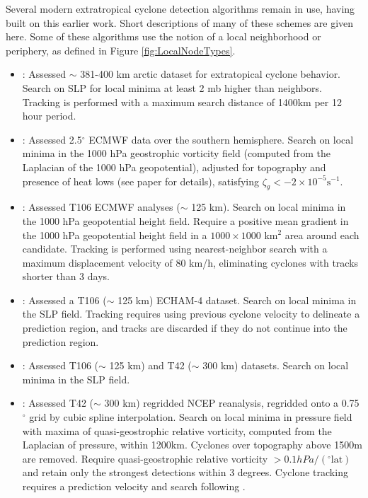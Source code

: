 \documentclass[gmdd, hvmath, online]{copernicus_discussions}
\begin{document}
Several modern extratropical cyclone detection algorithms remain in use, having built on this earlier work.  Short descriptions of many of these schemes are given here.  Some of these algorithms use the notion of a local neighborhood or periphery, as defined in Figure \ref{fig:LocalNodeTypes}.

\begin{itemize}
\item \cite{serreze1993characteristics, serreze1995climatological}:  Assessed $\sim$ 381-400 km arctic dataset for extratopical cyclone behavior.  Search on SLP for local minima at least 2 mb higher than neighbors.  Tracking is performed with a maximum search distance of 1400km per 12 hour period.

\item \cite{sinclair1994objective, sinclair1997objective}:  Assessed 2.5$^\circ$ ECMWF data over the southern hemisphere.  Search on local minima in the 1000 hPa geostrophic vorticity field (computed from the Laplacian of the 1000 hPa geopotential), adjusted for topography and presence of heat lows (see paper for details), satisfying $\zeta_g < -2 \times 10^{-5} \mbox{s}^{-1}$.

\item \cite{blender1997identification}:  Assessed T106 ECMWF analyses ($\sim$ 125 km).  Search on local minima in the 1000 hPa geopotential height field.  Require a positive mean gradient in the 1000 hPa geopotential height field in a $1000 \times 1000$ km$^2$ area around each candidate.  Tracking is performed using nearest-neighbor search with a maximum displacement velocity of 80 km/h, eliminating cyclones with tracks shorter than 3 days.

\item \cite{lionello2002cyclones}:  Assessed a T106 ($\sim$ 125 km) ECHAM-4 dataset.  Search on local minima in the SLP field.  Tracking requires using previous cyclone velocity to delineate a prediction region, and tracks are discarded if they do not continue into the prediction region.

\item \cite{zolina2002improving}:  Assessed T106 ($\sim$ 125 km) and T42 ($\sim$ 300 km) datasets.  Search on local minima in the SLP field.

\item \cite{pinto2005sensitivities}:  Assessed T42 ($\sim$ 300 km) regridded NCEP reanalysis, regridded onto a 0.75$^\circ$ grid by cubic spline interpolation.  Search on local minima in pressure field with maxima of quasi-geostrophic relative vorticity, computed from the Laplacian of pressure, within 1200km.  Cyclones over topography above 1500m are removed.  Require quasi-geostrophic relative vorticity $> 0.1 hPa / (^\circ \mbox{lat})$ and retain only the strongest detections within 3 degrees.  Cyclone tracking requires a prediction velocity and search following \cite{murray1991numerical}.


\end{itemize}
\end{document}
